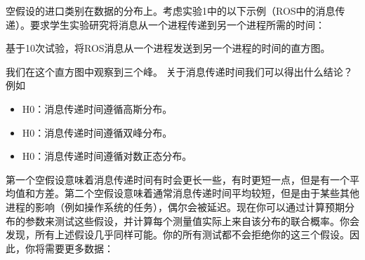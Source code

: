 空假设的进口类别在数据的分布上。考虑实验1中的以下示例（ROS中的消息传递）。要求学生实验研究将消息从一个进程传递到另一个进程所需的时间：

\begin{framed}

基于10次试验，将ROS消息从一个进程发送到另一个进程的时间的直方图。
\end{framed}


我们在这个直方图中观察到三个峰。 关于消息传递时间我们可以得出什么结论？例如

\begin{itemize}

\item H0：消息传递时间遵循高斯分布。
\item H0：消息传递时间遵循双峰分布。
\item H0：消息传递时间遵循对数正态分布。
\end{itemize}


第一个空假设意味着消息传递时间有时会更长一些，有时更短一点，但是有一个平均值和方差。第二个空假设意味着通常消息传递时间平均较短，但是由于某些其他进程的影响（例如操作系统的任务），偶尔会被延迟。现在你可以通过计算预期分布的参数来测试这些假设，并计算每个测量值实际上来自该分布的联合概率。你会发现，所有上述假设几乎同样可能。你的所有测试都不会拒绝你的这三个假设。因此，你将需要更多数据：

